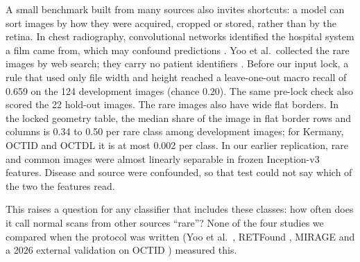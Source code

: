 \documentclass[conference]{IEEEtran}
\begin{document}
A small benchmark built from many sources also invites shortcuts: a model can sort images by how they were acquired, cropped or stored, rather than by the retina. In chest radiography, convolutional networks identified the hospital system a film came from, which may confound predictions \cite{Zech2018}.
Yoo et al.\ collected the rare images by web search; they carry no patient identifiers \cite{Yoo2021}.
Before our input lock, a rule that used only file width and height reached a leave-one-out macro recall of 0.659 on the 124 development images (chance 0.20). The same pre-lock check also scored the 22 hold-out images.
The rare images also have wide flat borders. In the locked geometry table, the median share of the image in flat border rows and columns is 0.34 to 0.50 per rare class among development images; for Kermany, OCTID and OCTDL it is at most 0.002 per class.
In our earlier replication, rare and common images were almost linearly separable in frozen Inception-v3 features. Disease and source were confounded, so that test could not say which of the two the features read.

This raises a question for any classifier that includes these classes: how often does it call normal scans from other sources ``rare''? None of the four studies we compared when the protocol was written (Yoo et al.\ \cite{Yoo2021}, RETFound \cite{RETFound2023}, MIRAGE \cite{MIRAGE2025} and a 2026 external validation on OCTID \cite{TVST2026}) measured this.
\end{document}

